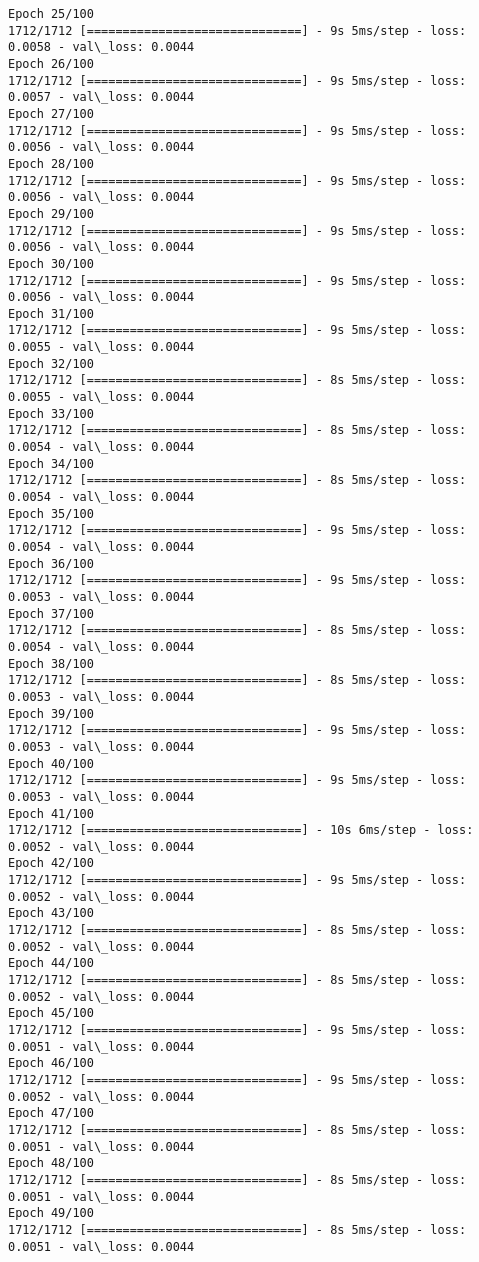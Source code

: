 \documentclass[11pt]{article}
\begin{document}
\begin{Verbatim}[commandchars=\\\{\}]
Epoch 25/100
1712/1712 [==============================] - 9s 5ms/step - loss: 0.0058 - val\_loss: 0.0044
Epoch 26/100
1712/1712 [==============================] - 9s 5ms/step - loss: 0.0057 - val\_loss: 0.0044
Epoch 27/100
1712/1712 [==============================] - 9s 5ms/step - loss: 0.0056 - val\_loss: 0.0044
Epoch 28/100
1712/1712 [==============================] - 9s 5ms/step - loss: 0.0056 - val\_loss: 0.0044
Epoch 29/100
1712/1712 [==============================] - 9s 5ms/step - loss: 0.0056 - val\_loss: 0.0044
Epoch 30/100
1712/1712 [==============================] - 9s 5ms/step - loss: 0.0056 - val\_loss: 0.0044
Epoch 31/100
1712/1712 [==============================] - 9s 5ms/step - loss: 0.0055 - val\_loss: 0.0044
Epoch 32/100
1712/1712 [==============================] - 8s 5ms/step - loss: 0.0055 - val\_loss: 0.0044
Epoch 33/100
1712/1712 [==============================] - 8s 5ms/step - loss: 0.0054 - val\_loss: 0.0044
Epoch 34/100
1712/1712 [==============================] - 8s 5ms/step - loss: 0.0054 - val\_loss: 0.0044
Epoch 35/100
1712/1712 [==============================] - 9s 5ms/step - loss: 0.0054 - val\_loss: 0.0044
Epoch 36/100
1712/1712 [==============================] - 9s 5ms/step - loss: 0.0053 - val\_loss: 0.0044
Epoch 37/100
1712/1712 [==============================] - 8s 5ms/step - loss: 0.0054 - val\_loss: 0.0044
Epoch 38/100
1712/1712 [==============================] - 8s 5ms/step - loss: 0.0053 - val\_loss: 0.0044
Epoch 39/100
1712/1712 [==============================] - 9s 5ms/step - loss: 0.0053 - val\_loss: 0.0044
Epoch 40/100
1712/1712 [==============================] - 9s 5ms/step - loss: 0.0053 - val\_loss: 0.0044
Epoch 41/100
1712/1712 [==============================] - 10s 6ms/step - loss: 0.0052 - val\_loss: 0.0044
Epoch 42/100
1712/1712 [==============================] - 9s 5ms/step - loss: 0.0052 - val\_loss: 0.0044
Epoch 43/100
1712/1712 [==============================] - 8s 5ms/step - loss: 0.0052 - val\_loss: 0.0044
Epoch 44/100
1712/1712 [==============================] - 8s 5ms/step - loss: 0.0052 - val\_loss: 0.0044
Epoch 45/100
1712/1712 [==============================] - 9s 5ms/step - loss: 0.0051 - val\_loss: 0.0044
Epoch 46/100
1712/1712 [==============================] - 9s 5ms/step - loss: 0.0052 - val\_loss: 0.0044
Epoch 47/100
1712/1712 [==============================] - 8s 5ms/step - loss: 0.0051 - val\_loss: 0.0044
Epoch 48/100
1712/1712 [==============================] - 8s 5ms/step - loss: 0.0051 - val\_loss: 0.0044
Epoch 49/100
1712/1712 [==============================] - 8s 5ms/step - loss: 0.0051 - val\_loss: 0.0044

\end{Verbatim}
\end{document}
